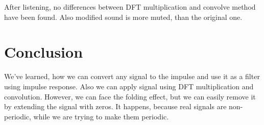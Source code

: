 \documentclass[a4paper]{article}
\begin{document}
        After listening, no differences between DFT multiplication and convolve method have been found. Also modified sound is more muted, than the original one.
            
    \newpage
        \section{Conclusion}
            We've learned, how we can convert any signal to the impulse and use it as a filter using impulse response. Also we can apply signal using DFT multiplication and convolution. However, we can face the folding effect, but we can easily remove it by extending the signal with zeros. It happens, because real signals are non-periodic, while we are trying to make them periodic.
     
\end{document}

